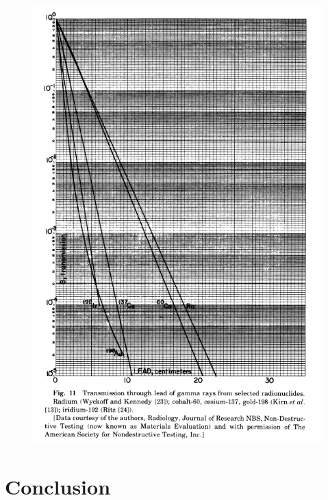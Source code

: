 \documentclass[%
aps,
mph,%
amsmath,amssymb,
preprint,%
tightenlines,
longbibliography,
superscriptaddress,
floatfix,
nofootinbib,
]{revtex4-2}
\begin{document}
    \begin{figure}[h!]
        \centering
        \includegraphics[width=0.75\linewidth]{figures/image.png}
        \label{lead_thicc}
    \end{figure}

    
\section{Conclusion}


\end{document}
